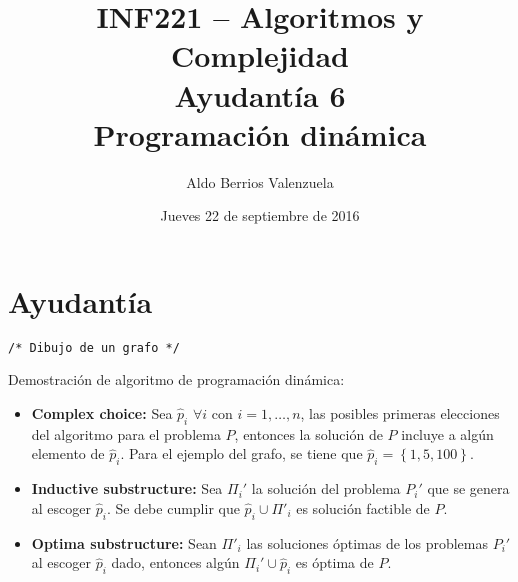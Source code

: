 \documentclass[english, spanish, fleqn, 10pt]{article}
\title{INF221 -- Algoritmos y Complejidad\\[.4\baselineskip]Ayudantía 6\\Programación dinámica}
\author{Aldo Berrios Valenzuela}
\date{Jueves 22 de septiembre de 2016}
\newcommand{\comentarioc}[1]{\texttt{\textcolor{webred}{/* #1 */}}}
\numberwithin{equation}{section}
\newcommand{\llaves}[1]{\left \{ #1 \right \}}
\theoremstyle{definition}
\begin{document}
\maketitle
\section{Ayudantía}
\begin{center}
	\comentarioc{Dibujo de un grafo}
\end{center}
Demostración de algoritmo de programación dinámica:
\begin{itemize}
	\item \textbf{Complex choice:} Sea $\hat p_i$ $\forall i$ con $i=1, \ldots, n$, las posibles primeras elecciones del algoritmo para el problema $P$, entonces la solución de $P$ incluye a algún elemento de $\hat p_i$. Para el ejemplo del grafo, se tiene que $\hat p_i=\llaves{1, 5, 100}$.
	
	\item \textbf{Inductive substructure:} Sea $\Pi_i'$ la solución del problema $P_i'$ que se genera al escoger $\hat p_i$. Se debe cumplir que $\hat p_i\cup \Pi'_i$ es solución factible de $P$.
	
	\item \textbf{Optima substructure:} Sean $\Pi'_i$ las soluciones óptimas de los problemas $P_i'$ al escoger $\hat p_i$ dado, entonces algún $\Pi_i'\cup\hat p_i$ es óptima de $P$.
\end{itemize}
\end{document}
